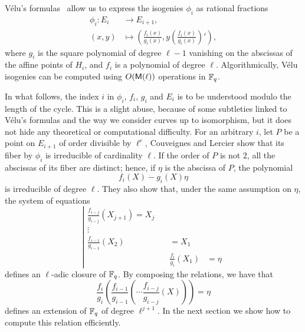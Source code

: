 \documentclass{sig-alternate}
\begin{document}
Vélu's formulas~\cite{velu71} allow us to express the isogenies
$\phi_i$ as rational fractions
\begin{equation}
  \begin{aligned}
    \phi_i: E_i &\to E_{i+1},\\
    (x,y) &\mapsto \left(\frac{f_i(x)}{g_i(x)}, y\left(\frac{f_i(x)}{g_i(x)}\right)'\right),
  \end{aligned}
\end{equation}
where $g_i$ is the square polynomial of degree $\ell-1$ vanishing on
the abscissas of the affine points of $H_i$, and $f_i$ is a polynomial
of degree $\ell$. Algorithmically, Vélu isogenies can be computed
using $O(\mathsf{M}(\ell))$ operations in $\mathbb{F}_q$. 

In what follows, the index $i$ in $\phi_i$, $f_i$, $g_i$ and $E_i$ is
to be understood modulo the length of the cycle. This is a slight
abuse, because of some subtleties linked to Vélu's formulas and the
way we consider curves up to isomorphism, but it does not hide any
theoretical or computational difficulty.  For an arbitrary $i$, let
$P$ be a point on $E_{i+1}$ of order divisible by $\ell^e$, Couveignes
and Lercier show that its fiber by $\phi_i$ is irreducible of
cardinality $\ell$. If the order of $P$ is not $2$, all the abscissas
of its fiber are distinct; hence, if $\eta$ is the abscissa of $P$,
the polynomial
\begin{equation}
  \label{eq:isog-fiber}
  f_i(X) - g_i(X)\eta
\end{equation}
is irreducible of degree $\ell$. They also show that, under the same
assumption on $\eta$, the system of equations
\begin{equation}
  \label{eq:elliptic}
  \left|
  \begin{aligned}
    \textstyle
    \frac{f_{i-j}}{g_{i-j}}(X_{j+1}) = X_j\quad\\
    \vdots\qquad\\
    \textstyle
    \frac{f_{i-1}}{g_{i-1}}(X_2) &= X_1\\
              &\textstyle\frac{f_i}{g_i}(X_1) &= \eta
  \end{aligned}
  \right.
\end{equation}
defines an $\ell$-adic closure of $\mathbb{F}_q$. By composing the relations,
we have that
\begin{equation}
  \label{eq:elliptic-uni}
  \frac{f_i}{g_i}\left(\frac{f_{i-1}}{g_{i-1}}\left(\cdots\frac{f_{i-j}}{g_{i-j}}(X)\right)\right) = \eta
\end{equation}
defines an extension of $\mathbb{F}_q$ of degree $\ell^{j+1}$. In the next
section we show how to compute this relation efficiently.
\end{document}
